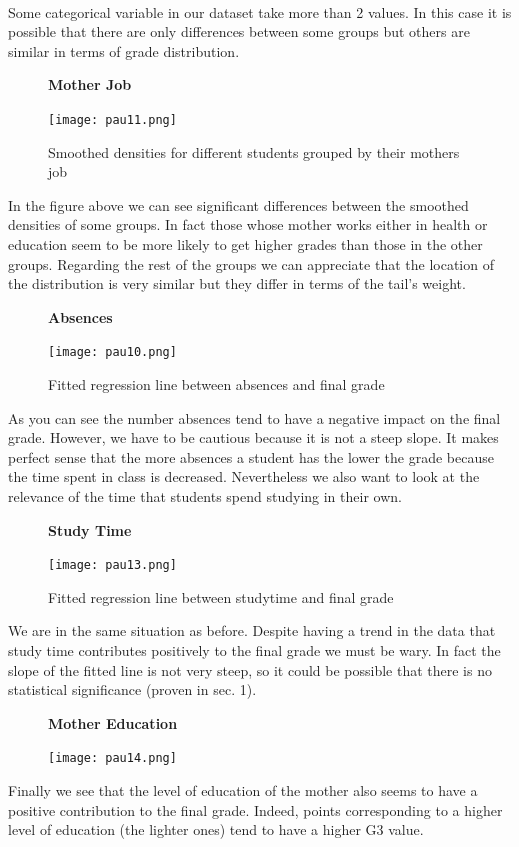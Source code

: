 \documentclass[a4paper, 11pt]{report}
\theoremstyle{definition}
\numberwithin{equation}{section}		%
\numberwithin{table}{section}				%
\begin{document}
\\[0.2in]
Some categorical variable in our dataset take more than 2 values. In this case it is possible that there are only differences between some groups but others are similar in terms of grade distribution.\\
\begin{figure}[h]\centering
\textbf{Mother Job}\par\medskip
\texttt{[image: pau11.png]}
\caption{Smoothed densities for different students grouped by their mothers job}
\end{figure}
In the figure above we can see significant differences between the smoothed densities of some groups. In fact those whose mother works either in health or education seem to be more likely to get higher grades than those in the other groups. Regarding the rest of the groups we can appreciate that the location of the distribution is very similar but they differ in terms of the tail's weight.\\
\begin{figure}[h]\centering
\textbf{Absences}\par\medskip
\texttt{[image: pau10.png]}
\caption{Fitted regression line between absences and final grade}
\end{figure}
As you can see the number absences tend to have a negative impact on the final grade. However, we have to be cautious because it is not a steep slope.
It makes perfect sense that the more absences a student has the lower the grade because the time spent in class is decreased. Nevertheless we also want to look at the relevance of the time that students spend studying in their own.
\begin{figure}[h]\centering
\textbf{Study Time}\par\medskip
\texttt{[image: pau13.png]}
\caption{Fitted regression line between studytime and final grade}
\end{figure}
We are in the same situation as before. Despite having a trend in the data that study time contributes positively to the final grade we must be wary. In fact the slope of the fitted line is not very steep, so it could be possible that there is no statistical significance (proven in sec. 1). \\[0.3in]
\begin{figure}[h]\centering
\textbf{Mother Education}\par\medskip
\texttt{[image: pau14.png]}
\end{figure}
\newpage
Finally we see that the level of education of the mother also seems to have a positive contribution to the final grade. Indeed, points corresponding to a higher level of education (the lighter ones) tend to have a higher G3 value.
\newpage
\end{document}
